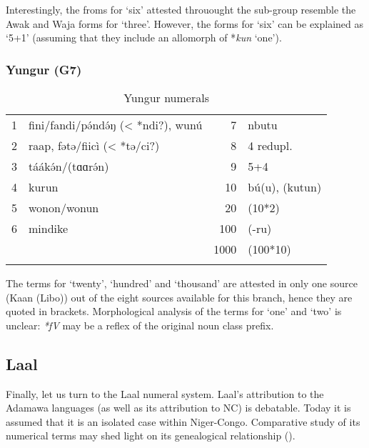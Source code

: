 Interestingly, the froms for ‘six’ attested throuought the sub-group resemble the Awak and Waja forms for ‘three’. However, the forms for ‘six’ can be explained as ‘5+1’ (assuming that they include an allomorph of *\textit{kun} ‘one’).

\subsubsection{Yungur (G7)}%
\begin{table}
\caption{\label{tab:3:115}Yungur numerals}


\begin{tabularx}{\textwidth}{llrX}
\lsptoprule

1 & fini/fandi/p{\'{ə}}nd{\'{ə}}ŋ (< *ndi?), wun{\'{u}} & 7 & nbutu\\
2 & raap, fətə/fiicì (< *tə/ci?) & 8 & 4 redupl.\\
3 & táák{\'{ə}}n/(tɑɑr{\'{ə}}n) & 9 & 5+4\\
4 & kurun & 10 & b{\'{u}}(u), (kutun)\\
5 & wonon/wonun & 20 & (10*2)\\
6 & mindike & 100 & (-ru)\\
&  & 1000 & (100*10)\\
\lspbottomrule
\end{tabularx}
\end{table}

The terms for ‘twenty’, ‘hundred’ and ‘thousand’ are attested in only one source (Kaan (Libo)) out of the eight sources available for this branch, hence they are quoted in brackets. Morphological analysis of the terms for ‘one’ and ‘two’ is unclear: \textit{*fV} may be a reflex of the original noun class prefix.

\clearpage
\subsection{Laal}%
Finally, let us turn to the Laal numeral system. Laal’s attribution to the Adamawa languages (as well as its attribution to NC) is debatable. Today it is assumed that it is an isolated case within Niger-Congo. Comparative study of its numerical terms may shed light on its genealogical relationship (). 

